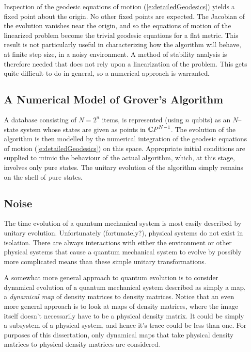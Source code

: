 Inspection of the geodesic equations of motion 
(\ref{e:detailedGeodesics}) yields a fixed point about the 
origin.  No other fixed points are expected. 
The Jacobian of the evolution vanishes near the origin, and
so the equations of motion of the linearized problem become
the trivial geodesic equations for a flat metric.
This result is not particularly useful in characterizing how 
the algorithm will behave, at finite step size, in a noisy 
environment.  
A method of stability analysis
is therefore needed that does not rely upon a linearization
of the problem.  This gets quite difficult to do in general,
so a numerical approach is warranted.

\subsection{A Numerical Model of Grover's Algorithm}

A database consisting of $N=2^n$ items, is represented (using
$n$ qubits) as an $N$--state system whose states are given as
points in ${\mathbb{C} P}^{N-1}$.  The evolution of the algorithm is then 
modelled by the numerical integration of the geodesic equations 
of motion (\ref{e:detailedGeodesics}) on this space.
Appropriate initial conditions are supplied to mimic the behaviour of 
the actual algorithm, which, at this stage, involves only pure 
states.  The unitary evolution of the algorithm simply remains 
on the shell of pure states.


\subsection{Noise}

The time evolution of a quantum mechanical system is most easily
described by unitary evolution.
Unfortunately (fortunately?), physical systems do not exist in 
isolation.  There
are always interactions with either the environment or other 
physical systems that cause a quantum mechanical system to evolve 
by possibly more complicated means than these simple unitary 
transformations.

A somewhat more general approach to quantum evolution is to 
consider dynamical evolution of a quantum mechanical system
described as simply a map, a \emph{dynamical map}\cite{Sudarshan:??}
of density matrices to density matrices.
Notice that an even more general approach is to look at maps of 
density matrices, where the image itself doesn't necessarily have to
be a physical density matrix.  It could be simply a subsystem
of a physical system, and hence it's trace could be less than
one.  For purposes of this dissertation, only dynamical maps that
take physical density matrices to physical density matrices are
considered.

